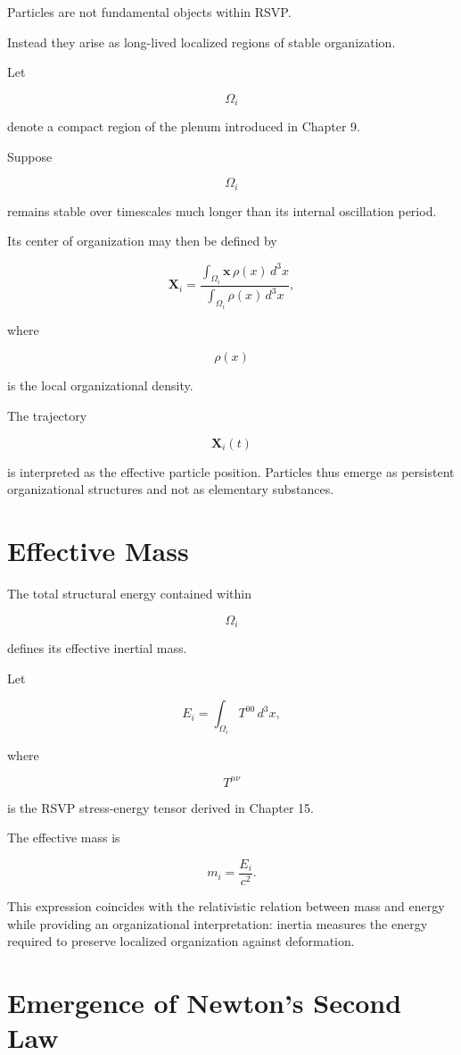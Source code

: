 \documentclass[11pt,oneside]{book}
\numberwithin{equation}{chapter}
\theoremstyle{definition}
\theoremstyle{plain}
\begin{document}
Particles are not fundamental objects within RSVP.

Instead they arise as long-lived localized regions of stable organization.

Let

\[
\Omega_i
\]

denote a compact region of the plenum introduced in Chapter 9.

Suppose

\[
\Omega_i
\]

remains stable over timescales much longer than its internal oscillation
period.

Its center of organization may then be defined by

\[
\mathbf X_i
=
\frac{\displaystyle
\int_{\Omega_i}
\mathbf x\,\rho(x)\,d^3x}
{\displaystyle
\int_{\Omega_i}
\rho(x)\,d^3x},
\]

where

\[
\rho(x)
\]

is the local organizational density.

The trajectory

\[
\mathbf X_i(t)
\]

is interpreted as the effective particle position. Particles thus emerge as persistent organizational structures and not as elementary substances.

\section{Effective Mass}

The total structural energy contained within

\[
\Omega_i
\]

defines its effective inertial mass.

Let

\[
E_i
=
\int_{\Omega_i}
T^{00}\,d^3x,
\]

where

\[
T^{\mu\nu}
\]

is the RSVP stress-energy tensor derived in Chapter 15.

The effective mass is

\[
m_i
=
\frac{E_i}{c^2}.
\]

This expression coincides with the relativistic relation between mass and
energy while providing an organizational interpretation: inertia measures
the energy required to preserve localized organization against deformation.

\section{Emergence of Newton's Second Law}
\end{document}
